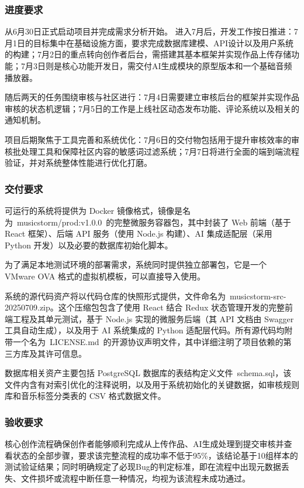 \documentclass{base}
\numberwithin{figure}{section} %
\begin{document}
\subsubsection{进度要求}

从6月30日正式启动项目并完成需求分析开始。
进入7月后，开发工作按日推进：7月1日的目标集中在基础设施方面，要求完成数据库建模、API设计以及用户系统的构建；7月2日的重点转向创作者后台，需搭建其基本框架并实现作品上传存储功能；7月3日则是核心功能开发日，需交付AI生成模块的原型版本和一个基础音频播放器。

随后两天的任务围绕审核与社区进行：7月4日需要建立审核后台的框架并实现作品审核的状态机逻辑；7月5日的工作是上线社区动态发布功能、评论系统以及相关的通知机制。

项目后期聚焦于工具完善和系统优化：7月6日的交付物包括用于提升审核效率的审核批处理工具和保障社区内容的敏感词过滤系统；7月7日将进行全面的端到端流程验证，并对系统整体性能进行优化打磨。

\subsubsection{交付要求}
可运行的系统将提供为 Docker 镜像格式，镜像是名为 musicstorm/prod:v1.0.0 的完整微服务容器包，其中封装了 Web 前端（基于 React 框架）、后端 API 服务（使用 Node.js 构建）、AI 集成适配层（采用 Python 开发）以及必要的数据库初始化脚本。

为了满足本地测试环境的部署需求，系统同时提供独立部署包，它是一个 VMware OVA 格式的虚拟机模板，可以直接导入使用。

系统的源代码资产将以代码仓库的快照形式提供，文件命名为 musicstorm-src-20250709.zip。这个压缩包包含了使用 React 结合 Redux 状态管理开发的完整前端工程及其单元测试，基于 Node.js 实现的微服务后端（其 API 文档由 Swagger 工具自动生成），以及用于 AI 系统集成的 Python 适配层代码。所有源代码均附带一个名为 LICENSE.md 的开源协议声明文件，其中详细注明了项目依赖的第三方库及其许可信息。

数据库相关资产主要包括 PostgreSQL 数据库的表结构定义文件 schema.sql，该文件内含有对索引优化的注释说明，以及用于系统初始化的关键数据，如审核规则库和音乐标签分类表的 CSV 格式数据文件。

\subsubsection{验收要求}

核心创作流程确保创作者能够顺利完成从上传作品、AI生成处理到提交审核并查看状态的全部步骤，要求该完整流程的成功率不低于95\%，该结论基于10组样本的测试验证结果；同时明确规定了必现Bug的判定标准，即在流程中出现元数据丢失、文件损坏或流程中断任意一种情况，均视为该流程未成功通过。
\end{document}
